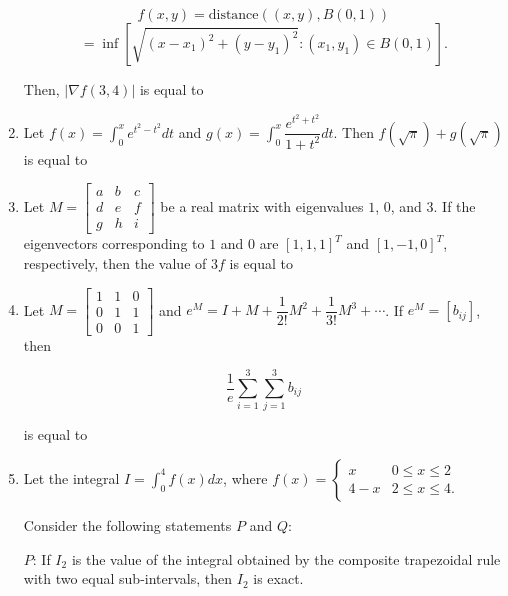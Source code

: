 \documentclass[journal]{IEEEtran}
\DeclareMathOperator*{\infimum}{inf}
\newcommand{\brak}[1]{\left( #1 \right)}
\newcommand{\sbrak}[1]{\left[ #1 \right]}
\newcommand{\abs}[1]{\left| #1 \right|}
\begin{document}
\begin{enumerate}
    $$f\brak{x,y} = \text{distance}\brak{\brak{x,y}, B\brak{0,1}}$$
    $$= \infimum\sbrak{\sqrt{\brak{x - x_1}^2 + \brak{y - y_1}^2} : \brak{x_1,y_1} \in B\brak{0,1}}.$$

    Then, $\abs{\nabla f\brak{3,4}}$ is equal to \underline{\hspace{2cm}}

\item Let $f\brak{x} = \int_{0}^{x} e^{t^2 - t^2} dt$ and $g\brak{x} = \int_{0}^{x} \dfrac{e^{t^2 + t^2}}{1 + t^2} dt$. Then $f\brak{\sqrt{\pi}} + g\brak{\sqrt{\pi}}$ is equal to \underline{\hspace{2cm}}

\item Let $M = \begin{bmatrix}
        a & b & c \\
        d & e & f \\
        g & h & i
    \end{bmatrix}$ be a real matrix with eigenvalues $1$, $0$, and $3$. If the eigenvectors corresponding to $1$ and $0$ are $\sbrak{1,1,1}^T$ and $\sbrak{1,-1,0}^T$, respectively, then  
 the value of $3 f$ is equal to \underline{\hspace{2cm}}

\item Let $M = \begin{bmatrix}
        1 & 1 & 0 \\
        0 & 1 & 1 \\
        0 & 0 & 1
    \end{bmatrix}$ and $e^M = I + M + \dfrac{1}{2!} M^2 + \dfrac{1}{3!} M^3 + \cdots$. If $e^M = \sbrak{b_{ij}}$, then 

    $$\dfrac{1}{e} \sum_{i=1}^3 \sum_{j=1}^3 b_{ij}$$

    is equal to \underline{\hspace{2cm}}

\item Let the integral $I = \int_{0}^{4} f\brak{x} dx$, where $f\brak{x} = \begin{cases}
        x & 0 \leq x \leq 2 \\
        4 - x & 2 \leq x \leq 4.
    \end{cases}$

    Consider the following statements $P$ and $Q$:

    $P$: If $I_2$ is the value of the integral obtained by the composite trapezoidal rule with two equal sub-intervals, then  
 $I_2$ is exact.


\end{enumerate}
\end{document}
